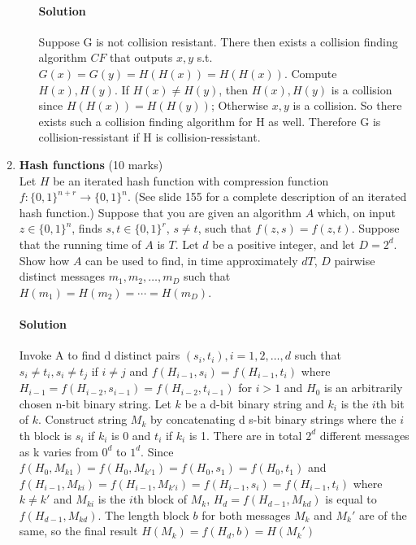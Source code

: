\documentclass[11pt]{article}
\begin{document}
\begin{enumerate}
\begin{enumerate}
\paragraph{Solution}
Suppose G is not collision resistant. There then exists a collision finding algorithm $CF$ that outputs $x,y$ s.t. $G(x)=G(y)=H(H(x))=H(H(x))$. Compute $H(x),H(y)$. If $H(x) \neq H(y)$, then $H(x), H(y)$ is a collision since $H(H(x))=H(H(y))$; Otherwise $x, y$ is a collision. So there exists such a collision finding algorithm for H as well. Therefore G is collision-ressistant if H is collision-ressistant.
\end{enumerate}
\newpage


\item {\bf Hash functions} (10 marks)\\
Let $H$ be an iterated hash function with compression function
$f : \{0,1\}^{n+r} \rightarrow \{0,1\}^n$. (See slide 155 for a complete
description of an iterated hash function.) Suppose that you are
given an algorithm $A$ which, on input $z \in \{0,1\}^n$, finds
$s,t \in \{0,1\}^r$, $s \neq t$, such that $f(z,s)=f(z,t)$.
Suppose that the running time of $A$ is $T$. Let $d$ be a positive
integer, and let $D=2^d$. Show how $A$ can be used to find, in time
approximately $d T$, $D$ pairwise distinct messages
$m_1,m_2,\ldots,m_D$ such that $H(m_1)=H(m_2)=\cdots=H(m_D)$.
\paragraph{Solution}
Invoke A to find d distinct pairs $(s_i,t_i),i=1,2,\dots,d$ such that $s_i \neq t_i, s_i \neq t_j$ if $i\neq j$ and $f(H_{i-1},s_i)=f(H_{i-1},t_i)$ where $H_{i-1}=f(H_{i-2},s_{i-1})=f(H_{i-2},t_{i-1})$ for $i > 1$ and $H_0$ is an arbitrarily chosen n-bit binary string. Let $k$ be a d-bit binary string and $k_i$ is the $i$th bit of $k$. Construct string $M_k$ by concatenating d s-bit binary strings where the $i$th block is $s_i$ if $k_i$ is 0 and $t_i$ if $k_i$ is 1. There are in total $2^d$ different messages as k varies from $0^d$ to $1^d$.
Since $f(H_0,M_{k1})=f(H_0,M_{k'1})=f(H_0,s_1)=f(H_0,t_1)$ and $f(H_{i-1},M_{ki})=f(H_{i-1},M_{k'i})=f(H_{i-1},s_i)=f(H_{i-1},t_i)$ where $k\neq k'$ and $M_{ki}$ is the $i$th block of $M_k$, $H_d=f(H_{d-1},M_{kd})$ is equal to $f(H_{d-1},M_{kd})$. The length block $b$ for both messages $M_k$ and $M_k'$ are of the same, so the final result $H(M_k) = f(H_d,b) = H(M_k')$


\end{enumerate}
\end{document}
